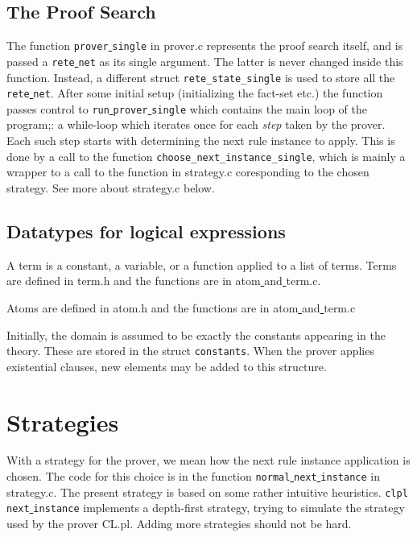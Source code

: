 \documentclass[a4paper]{article}
\begin{document}
\subsection{The Proof Search}
The function \verb|prover|\underline{ }\verb|single| in prover.c represents the proof search itself, and is passed a \verb|rete|\underline{ }\verb|net| as its single argument. The latter is never changed inside this function. Instead, a different struct \verb|rete_state_single| is used to store all the \verb|rete|\underline{ }\verb|net|. After some initial setup (initializing the fact-set etc.) the function passes control to  \verb|run|\underline{ }\verb|prover|\underline{ }\verb|single| which contains the main loop of the program;: a while-loop which iterates once for each \emph{step} taken by the prover. Each such step starts with determining the next rule instance to apply. This is done by a call to the function \verb|choose_next_instance_single|, which is mainly a wrapper to a call to the function in strategy.c coresponding to the chosen strategy. See more about strategy.c below.

\subsection{Datatypes for logical expressions}
A term is a constant, a variable, or a function applied to a list of terms. Terms are defined in term.h and the functions are in atom\underline{ }and\underline{ }term.c. 

Atoms are defined in atom.h and the functions are in atom\underline{ }and\underline{ }term.c

Initially, the domain is assumed to be exactly the constants appearing in the theory. These are stored in the struct \verb|constants|. When the prover applies existential clauses, new elements may be added to this structure. 

\section{Strategies}
With a strategy for the prover, we mean how the next rule instance application is chosen. The code for this choice is in the function \verb|normal|\underline{ }\verb|next|\underline{ }\verb|instance| in strategy.c. The present strategy is based on some rather intuitive heuristics. \verb|clpl|\underline{ }\verb|next|\underline{ }\verb|instance| implements a depth-first strategy, trying to simulate the strategy used by the prover CL.pl. Adding more strategies should not be hard.
\end{document}

